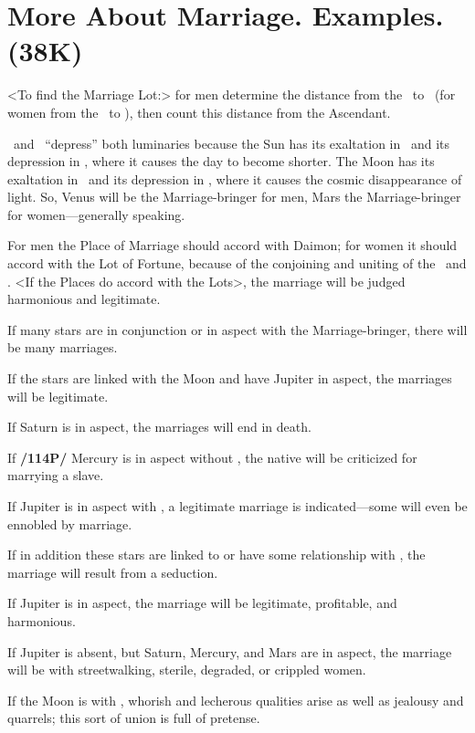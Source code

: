 \section{More About Marriage. Examples. (38K)}

<To find the Marriage Lot:> for men determine the distance from the \Sun\, to \Venus\, (for women from the \Moon\, to \Mars), then count this distance from the Ascendant. 

\Venus\, and \Mars\, “depress” both luminaries because the Sun has its exaltation in \Aries\, and its depression in \Libra, where it causes the day to become shorter. The Moon has its exaltation in \Taurus\, and its depression in \Scorpio, where it causes the cosmic disappearance of light. So, Venus will be the Marriage-bringer for men, Mars the Marriage-bringer for women—generally speaking. 

For men the Place of Marriage should accord with Daimon; for women it should accord with the Lot of Fortune, because of the conjoining and uniting of the \Sun\, and \Moon. <If the
Places do accord with the Lots>, the marriage will be judged harmonious and legitimate. 

If many stars are in conjunction or in aspect with the Marriage-bringer, there will be many marriages. 

If the stars are linked with the Moon and have Jupiter in aspect, the marriages will be legitimate. 

If Saturn is in aspect, the marriages will end in death. 

If \textbf{/114P/} Mercury is in aspect without \Jupiter, the native will be criticized for marrying a slave. 

If Jupiter is in aspect with \Saturn, a legitimate marriage is indicated—some will even be ennobled by marriage. 

If in addition these stars are linked to or have some relationship with \Venus, the marriage will result from a seduction. 

If Jupiter is in aspect, the marriage will be legitimate, profitable, and harmonious. 

If Jupiter is absent, but Saturn, Mercury, and Mars are in aspect, the marriage will be with streetwalking, sterile, degraded, or crippled women. 

If the Moon is with \Venus, whorish and lecherous qualities arise as well as jealousy and quarrels; this sort of union is full of pretense. 

